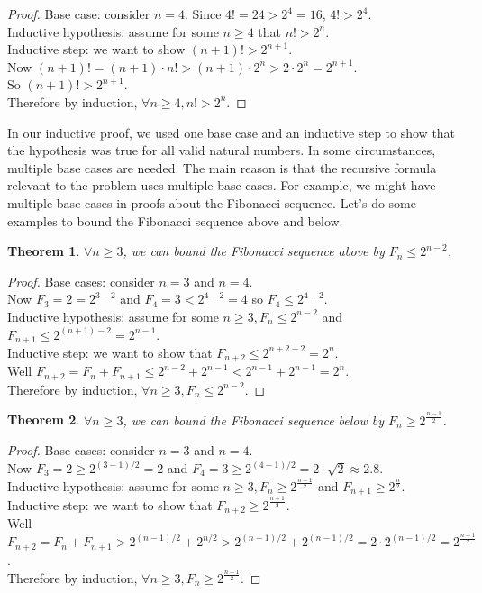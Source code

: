 \documentclass[11pt]{amsart}
\newtheorem{theorem}{Theorem}[section]
\theoremstyle{definition}
\begin{document}
\begin{proof}
	Base case: consider $n = 4$. Since $4! = 24 > 2^4 = 16$, $4! > 2^4$. \\
	Inductive hypothesis: assume for some $n \geq 4$ that $n! > 2^n$. \\
	Inductive step: we want to show $(n + 1)! > 2^{n + 1}$. \\
	Now $(n + 1)! = (n+1) \cdot n! > (n+1)\cdot 2^n > 2 \cdot 2^n = 2^{n + 1}$. \\
	So $(n + 1)! > 2^{n + 1}$. \\
	Therefore by induction, $\forall n \geq 4, n! > 2^n$.
\end{proof}
In our inductive proof, we used one base case and an inductive step to show that the hypothesis was true for all valid natural numbers. In some
circumstances, multiple base cases are needed. The main reason is that the recursive formula relevant to the problem uses multiple base 
cases. For example, we might have multiple base cases in proofs about the Fibonacci sequence. Let's do some examples to bound the
Fibonacci sequence above and below.
\begin{theorem}
	$\forall n \geq 3$, we can bound the Fibonacci sequence above by $F_n \leq 2^{n - 2}$.
\end{theorem}
\begin{proof}
	Base cases: consider $n = 3$ and $n = 4$. \\
	Now $F_3 = 2 = 2^{3 - 2}$ and $F_4 = 3 < 2^{4 - 2} = 4$ so $F_4 \leq 2^{4 - 2}$. \\
	Inductive hypothesis: assume for some $n \geq 3, F_n \leq 2^{n - 2}$ and $F_{n+1} \leq 2^{(n+1) - 2} = 2^{n - 1}$. \\
	Inductive step: we want to show that $F_{n+2} \leq 2^{n + 2 - 2} = 2^n$. \\
	Well $F_{n+2} = F_n + F_{n+1} \leq 2^{n - 2} + 2^{n - 1} < 2^{n - 1} + 2^{n - 1} = 2^n$. \\
	Therefore by induction, $\forall n \geq 3, F_n \leq 2^{n-2}$.
\end{proof}
\begin{theorem}
	$\forall n \geq 3$, we can bound the Fibonacci sequence below by $F_n \geq 2^{\frac{n-1}{2}}$.
\end{theorem}
\begin{proof}
	Base cases: consider $n = 3$ and $n = 4$. \\
	Now $F_3 = 2 \geq 2^{(3-1)/2} = 2$ and $F_4 = 3 \geq 2^{(4 - 1)/2} = 2 \cdot \sqrt{2} \approx 2.8$. \\
	Inductive hypothesis: assume for some $n \geq 3, F_n \geq 2^{\frac{n-1}{2}}$ and $F_{n+1} \geq 2^{\frac{n}{2}}$. \\
	Inductive step: we want to show that $F_{n+2} \geq 2^{\frac{n+1}{2}}$. \\
	Well $F_{n+2} = F_n + F_{n+1} > 2^{(n-1)/2} + 2^{n/2} > 2^{(n-1)/2} + 2^{(n-1)/2} = 2 \cdot 2^{(n-1)/2} = 2^{\frac{n+1}{2}} $. \\
	Therefore by induction, $\forall n \geq 3, F_n \geq 2^{\frac{n-1}{2}}$.
\end{proof}
\end{document}

